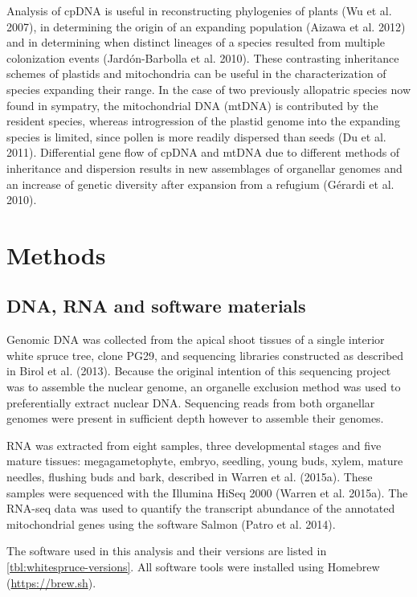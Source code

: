 \documentclass[
  12pt,
  oneside,
  openany]{book}
\begin{document}
Analysis of cpDNA is useful in reconstructing phylogenies of plants (Wu et al. 2007), in determining the origin of an expanding population (Aizawa et al. 2012) and in determining when distinct lineages of a species resulted from multiple colonization events (Jardón-Barbolla et al. 2010). These contrasting inheritance schemes of plastids and mitochondria can be useful in the characterization of species expanding their range. In the case of two previously allopatric species now found in sympatry, the mitochondrial DNA (mtDNA) is contributed by the resident species, whereas introgression of the plastid genome into the expanding species is limited, since pollen is more readily dispersed than seeds (Du et al. 2011). Differential gene flow of cpDNA and mtDNA due to different methods of inheritance and dispersion results in new assemblages of organellar genomes and an increase of genetic diversity after expansion from a refugium (Gérardi et al. 2010).

\hypertarget{methods-4}{%
\section{Methods}\label{methods-4}}

\hypertarget{dna-rna-and-software-materials}{%
\subsection{DNA, RNA and software materials}\label{dna-rna-and-software-materials}}

Genomic DNA was collected from the apical shoot tissues of a single interior white spruce tree, clone PG29, and sequencing libraries constructed as described in Birol et al. (2013). Because the original intention of this sequencing project was to assemble the nuclear genome, an organelle exclusion method was used to preferentially extract nuclear DNA. Sequencing reads from both organellar genomes were present in sufficient depth however to assemble their genomes.

RNA was extracted from eight samples, three developmental stages and five mature tissues: megagametophyte, embryo, seedling, young buds, xylem, mature needles, flushing buds and bark, described in Warren et al. (2015a). These samples were sequenced with the Illumina HiSeq 2000 (Warren et al. 2015a). The RNA-seq data was used to quantify the transcript abundance of the annotated mitochondrial genes using the software Salmon (Patro et al. 2014).

The software used in this analysis and their versions are listed in \cref{tbl:whitespruce-versions}. All software tools were installed using Homebrew (\url{https://brew.sh}).
\end{document}
